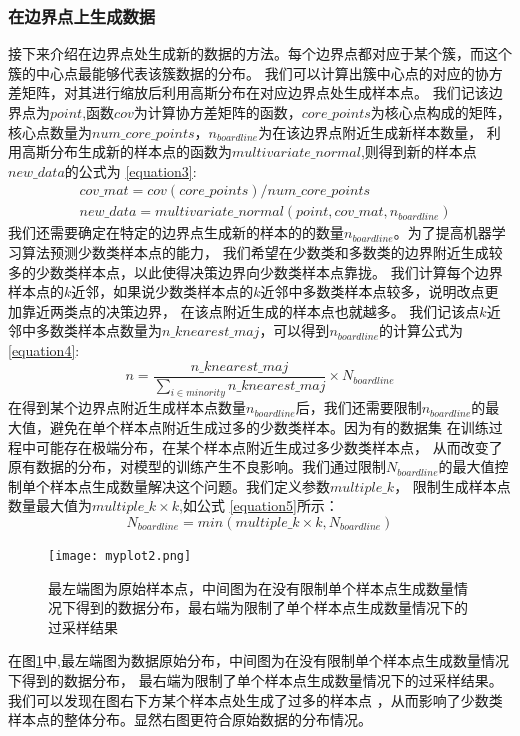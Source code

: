 \documentclass{article}
\begin{document}
\subsubsection{在边界点上生成数据}
接下来介绍在边界点处生成新的数据的方法。每个边界点都对应于某个簇，而这个簇的中心点最能够代表该簇数据的分布。
我们可以计算出簇中心点的对应的协方差矩阵，对其进行缩放后利用高斯分布在对应边界点处生成样本点。
我们记该边界点为$point$,函数$cov$为计算协方差矩阵的函数，$core\_points$为核心点构成的矩阵，核心点数量为$num\_core\_points$，$n_{boardline}$为在该边界点附近生成新样本数量，
利用高斯分布生成新的样本点的函数为$multivariate\_normal$,则得到新的样本点$new\_data$的公式为 \ref{equation3}:
\begin{equation}
  \label{equation3}
  \begin{aligned}
     & cov\_mat=cov(core\_points)/num\_core\_points \\
     & new\_data=multivariate\_normal(point,cov\_mat,n_{boardline})
  \end{aligned}
\end{equation}
我们还需要确定在特定的边界点生成新的样本的的数量$n_{boardline}$。为了提高机器学习算法预测少数类样本点的能力，
我们希望在少数类和多数类的边界附近生成较多的少数类样本点，以此使得决策边界向少数类样本点靠拢。
我们计算每个边界样本点的$k$近邻，如果说少数类样本点的$k$近邻中多数类样本点较多，说明改点更加靠近两类点的决策边界，
在该点附近生成的样本点也就越多。
我们记该点$k$近邻中多数类样本点数量为$n\_knearest\_maj$，可以得到$n_{boardline}$的计算公式为 \ref{equation4}:
\begin{equation}
  \label{equation4}
  n=\frac{n\_knearest\_maj}{\sum_{i\in minority} n\_knearest\_maj}\times N_{boardline}
\end{equation}
在得到某个边界点附近生成样本点数量$n_{boardline}$后，我们还需要限制$n_{boardline}$的最大值，避免在单个样本点附近生成过多的少数类样本。因为有的数据集
在训练过程中可能存在极端分布，在某个样本点附近生成过多少数类样本点，
从而改变了原有数据的分布，对模型的训练产生不良影响。我们通过限制$N_{boardline}$的最大值控制单个样本点生成数量解决这个问题。我们定义参数$multiple\_k$，
限制生成样本点数量最大值为$multiple\_k\times k$,如公式 \ref{equation5}所示：
\begin{equation}
  \label{equation5}
  N_{boardline}=min(multiple\_k \times k, N_{boardline})
\end{equation}
\begin{figure}
  \centering
  \texttt{[image: myplot2.png]}
  \caption{最左端图为原始样本点，中间图为在没有限制单个样本点生成数量情况下得到的数据分布，最右端为限制了单个样本点生成数量情况下的过采样结果}
  \label{fig2}
\end{figure}
在图\ref{fig2}中,最左端图为数据原始分布，中间图为在没有限制单个样本点生成数量情况下得到的数据分布，
最右端为限制了单个样本点生成数量情况下的过采样结果。我们可以发现在图右下方某个样本点处生成了过多的样本点
，从而影响了少数类样本点的整体分布。显然右图更符合原始数据的分布情况。
\end{document}
